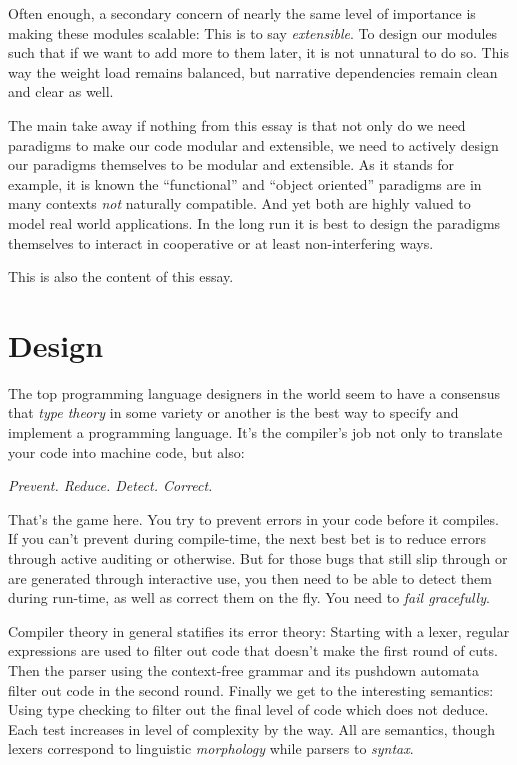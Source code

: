\documentclass[twoside]{article}
\begin{document}
Often enough, a secondary concern of nearly the same level of importance is making these modules scalable: This is to say
\emph{extensible}. To design our modules such that if we want to add more to them later, it is not unnatural to do so.
This way the weight load remains balanced, but narrative dependencies remain clean and clear as well.

The main take away if nothing from this essay is that not only do we need paradigms to make our code modular and extensible,
we need to actively design our paradigms themselves to be modular and extensible. As it stands for example, it is known
the ``functional'' and ``object oriented'' paradigms are in many contexts \emph{not} naturally compatible. And yet both
are highly valued to model real world applications. In the long run it is best to design the paradigms themselves to
interact in cooperative or at least non-interfering ways.

This is also the content of this essay.

\section*{Design}

The top programming language designers in the world seem to have a consensus that \emph{type theory} in
some variety or another is the best way to specify and implement a programming language. It's the compiler's
job not only to translate your code into machine code, but also:

{\em Prevent. Reduce. Detect. Correct.}

That's the game here. You try to prevent errors in your code before it compiles. If you can't prevent during compile-time,
the next best bet is to reduce errors through active auditing or otherwise. But for those bugs that still slip through
or are generated through interactive use, you then need to be able to detect them during run-time, as well as correct them
on the fly. You need to \emph{fail gracefully}.

Compiler theory in general statifies its error theory: Starting with a lexer, regular expressions are used to filter
out code that doesn't make the first round of cuts. Then the parser using the context-free grammar and its pushdown
automata filter out code in the second round. Finally we get to the interesting semantics: Using type checking to
filter out the final level of code which does not deduce. Each test increases in level of complexity by the way.
All are semantics, though lexers correspond to linguistic \emph{morphology} while parsers to \emph{syntax}.
\end{document}
